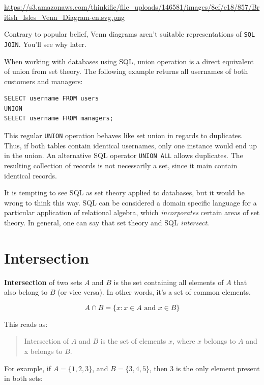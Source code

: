 \documentclass[12pt, a4paper, justified, notitlepage, sfsidenotes, notoc]{book}
\begin{document}
\url{https://s3.amazonaws.com/thinkific/file\_uploads/146581/images/8cf/e18/857/British\_Isles\_Venn\_Diagram-en.svg.png}

Contrary to popular belief, Venn diagrams aren't suitable representations of \texttt{SQL JOIN}. You'll see why later.

When working with databases using SQL, union operation is a direct equivalent of union from set theory. The following example returns all usernames of both customers and managers:

\begin{verbatim}
SELECT username FROM users
UNION
SELECT username FROM managers;
\end{verbatim}

This regular \texttt{UNION} operation behaves like set union in regards to duplicates. Thus, if both tables contain identical usernames, only one instance would end up in the union. An alternative SQL operator \texttt{UNION ALL} allows duplicates. The resulting collection of records is not necessarily a set, since it main contain identical records.

It is tempting to see SQL as set theory applied to databases, but it would be wrong to think this way. SQL can be considered a domain specific language for a particular application of relational algebra, which \emph{incorporates} certain areas of set theory. In general, one can say that set theory and SQL \emph{intersect}.

\section{Intersection}
\label{sec:org7e00705}

\textbf{\textbf{Intersection}} of two sets \(A\) and \(B\) is the set containing all elements of \(A\) that also belong to \(B\) (or vice versa). In other words, it's a set of common elements.

\begin{equation}
A \cap B = \{ x : x \in A \textrm{ and } x \in B \}
\end{equation}

This reads as:

\begin{quote}
Intersection of \(A\) and \(B\) is the set of elements \(x\), where \(x\) belongs to \(A\) and x belongs to \(B\).
\end{quote}

For example, if \(A = \{1, 2, 3\}\), and \(B = \{3, 4, 5\}\), then 3 is the only element present in both sets:
\end{document}
